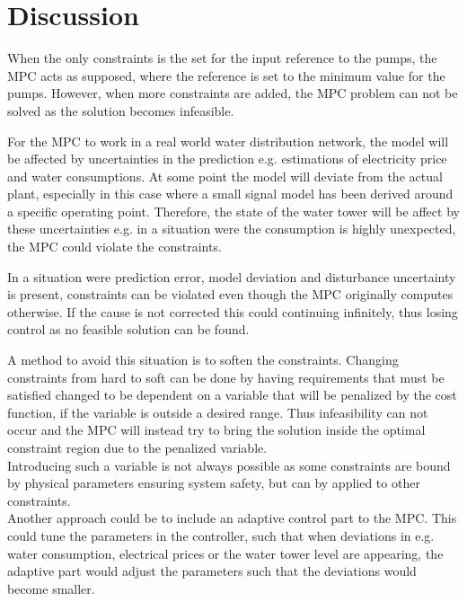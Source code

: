\chapter{Discussion}
\label{Discussion}

When the only constraints is the set for the input reference to the pumps, the MPC acts as supposed, where the reference is set to the minimum value for the pumps. However, when more constraints are added, the MPC problem can not be solved as the solution becomes infeasible.  

For the MPC to work in a real world water distribution network, the model will be affected by uncertainties in the prediction e.g. estimations of electricity price and water consumptions. At some point the model will deviate from the actual plant, especially in this case where a small signal model has been derived around a specific operating point. Therefore, the state of the water tower will be affect by these uncertainties e.g. in a situation were the consumption is highly unexpected, the MPC could violate the constraints.

In a situation were prediction error, model deviation and disturbance uncertainty is present, constraints can be violated even though the MPC originally computes otherwise. If the cause is not corrected this could continuing infinitely, thus losing control as no feasible solution can be found. 

A method to avoid this situation is to soften the constraints. Changing constraints from hard to soft can be done by having requirements that must be satisfied changed to be dependent on a variable that will be penalized by the cost function, if the variable is outside a desired range. Thus infeasibility can not occur and the MPC will instead try to bring the solution inside the optimal constraint region due to the penalized variable.\\   
Introducing such a variable is not always possible as some constraints are bound by physical parameters ensuring system safety, but can by applied to other constraints.\\

Another approach could be to include an adaptive control part to the MPC. This could tune the parameters in the controller, such that when deviations in e.g. water consumption, electrical prices or the water tower level are appearing, the adaptive part would adjust the parameters such that the deviations would become smaller.





